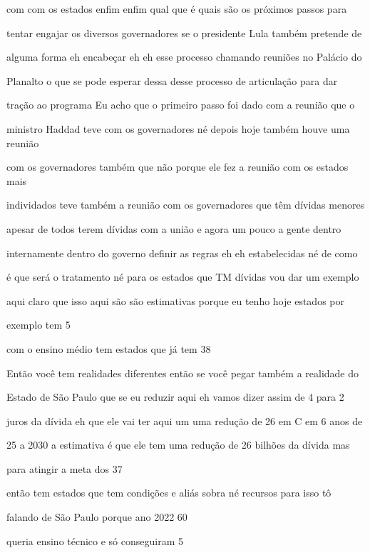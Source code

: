 \documentclass[a4paper,12pt]{article}
\begin{document}
com com os estados enfim enfim qual que é quais são os próximos passos para

tentar engajar os diversos governadores se o presidente Lula também pretende de

alguma forma eh encabeçar eh eh esse processo chamando reuniões no Palácio do

Planalto o que se pode esperar dessa desse processo de articulação para dar

tração ao programa Eu acho que o primeiro passo foi dado com a reunião que o

ministro Haddad teve com os governadores né depois hoje também houve uma reunião

com os governadores também que não porque ele fez a reunião com os estados mais

individados teve também a reunião com os governadores que têm dívidas menores

apesar de todos terem dívidas com a união e agora um pouco a gente dentro

internamente dentro do governo definir as regras eh eh estabelecidas né de como

é que será o tratamento né para os estados que TM dívidas vou dar um exemplo

aqui claro que isso aqui são são estimativas porque eu tenho hoje estados por

exemplo tem 5%

com o ensino médio tem estados que já tem 38%

Então você tem realidades diferentes então se você pegar também a realidade do

Estado de São Paulo que se eu reduzir aqui eh vamos dizer assim de 4 para 2%

juros da dívida eh que ele vai ter aqui um uma redução de 26 em C em 6 anos de

25 a 2030 a estimativa é que ele tem uma redução de 26 bilhões da dívida mas

para atingir a meta dos 37%

então tem estados que tem condições e aliás sobra né recursos para isso tô

falando de São Paulo porque ano 2022 60%

queria ensino técnico e só conseguiram 5%
\end{document}
